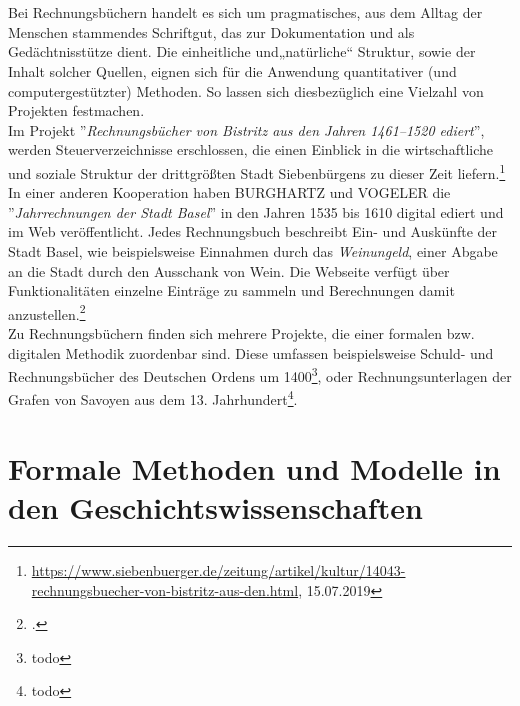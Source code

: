 \documentclass[12pt,a4paper]{article}
\begin{document}
\\
\\
Bei Rechnungsbüchern handelt es sich um pragmatisches, aus dem Alltag der Menschen stammendes Schriftgut, das zur Dokumentation und als Gedächtnisstütze dient. Die einheitliche und„natürliche“ Struktur, sowie der Inhalt solcher Quellen, eignen sich für die Anwendung quantitativer
(und computergestützter) Methoden. So lassen sich diesbezüglich eine Vielzahl von Projekten festmachen.
\\
Im Projekt ''\textit{Rechnungsbücher von Bistritz aus den Jahren 1461–1520 ediert}'', werden Steuerverzeichnisse erschlossen, die einen Einblick in die wirtschaftliche und soziale Struktur der drittgrößten Stadt Siebenbürgens zu dieser Zeit liefern.\footnote{\url{https://www.siebenbuerger.de/zeitung/artikel/kultur/14043-rechnungsbuecher-von-bistritz-aus-den.html}, 15.07.2019}
\\
In einer anderen Kooperation haben BURGHARTZ und VOGELER die ''\textit{Jahrrechnungen der Stadt Basel}'' in den Jahren 1535 bis 1610 digital ediert und im Web veröffentlicht. Jedes Rechnungsbuch beschreibt Ein- und Auskünfte der Stadt Basel, wie beispielsweise Einnahmen durch das \textit{Weinungeld}, einer Abgabe an die Stadt durch den Ausschank von Wein. Die Webseite verfügt über Funktionalitäten einzelne Einträge zu sammeln und Berechnungen damit anzustellen.\footcite[][S.11-13, \protect\url{https:gams.uni-graz.at/srbas}]{vogeler2016content}
\\
Zu Rechnungsbüchern finden sich mehrere Projekte, die einer formalen bzw. digitalen Methodik zuordenbar sind. Diese umfassen  beispielsweise Schuld- und Rechnungsbücher des Deutschen Ordens um 1400\footnote{todo}, oder Rechnungsunterlagen der Grafen von Savoyen aus dem  13. Jahrhundert\footnote{todo}.




\newpage
\section{Formale Methoden und Modelle in den Geschichtswissenschaften}
\end{document}
